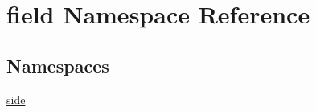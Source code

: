 \hypertarget{namespacefield}{}\section{field Namespace Reference}
\label{namespacefield}
\subsection*{Namespaces}
\begin{DoxyCompactItemize}
\item 
 \hyperlink{namespacefield_1_1side}{side}
\end{DoxyCompactItemize}
